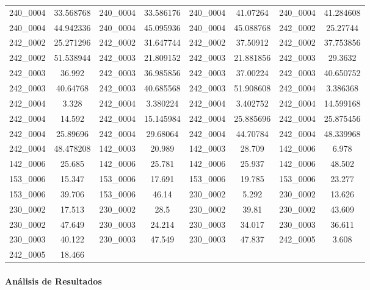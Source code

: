 \begin{table}[H]
\begin{tabular}{|c|c|c|c|c|c|c|c|}
        240\_0004 & 33.568768 & 240\_0004 & 33.586176 & 240\_0004 & 41.07264 & 240\_0004 & 41.284608 \\
        240\_0004 & 44.942336 & 240\_0004 & 45.095936 & 240\_0004 & 45.088768 & 242\_0002 & 25.27744 \\
        242\_0002 & 25.271296 & 242\_0002 & 31.647744 & 242\_0002 & 37.50912 & 242\_0002 & 37.753856 \\
        242\_0002 & 51.538944 & 242\_0003 & 21.809152 & 242\_0003 & 21.881856 & 242\_0003 & 29.3632 \\
        242\_0003 & 36.992 & 242\_0003 & 36.985856 & 242\_0003 & 37.00224 & 242\_0003 & 40.650752 \\
        242\_0003 & 40.64768 & 242\_0003 & 40.685568 & 242\_0003 & 51.908608 & 242\_0004 & 3.386368 \\
        242\_0004 & 3.328 & 242\_0004 & 3.380224 & 242\_0004 & 3.402752 & 242\_0004 & 14.599168 \\
        242\_0004 & 14.592 & 242\_0004 & 15.145984 & 242\_0004 & 25.885696 & 242\_0004 & 25.875456 \\
        242\_0004 & 25.89696 & 242\_0004 & 29.68064 & 242\_0004 & 44.70784 & 242\_0004 & 48.339968 \\
        242\_0004 & 48.478208 & 142\_0003 & 20.989 & 142\_0003 & 28.709 & 142\_0006 & 6.978 \\
        142\_0006 & 25.685 & 142\_0006 & 25.781 & 142\_0006 & 25.937 & 142\_0006 & 48.502 \\
        153\_0006 & 15.347 & 153\_0006 & 17.691 & 153\_0006 & 19.785 & 153\_0006 & 23.277 \\
        153\_0006 & 39.706 & 153\_0006 & 46.14 & 230\_0002 & 5.292 & 230\_0002 & 13.626 \\
        230\_0002 & 17.513 & 230\_0002 & 28.5 & 230\_0002 & 39.81 & 230\_0002 & 43.609 \\
        230\_0002 & 47.649 & 230\_0003 & 24.214 & 230\_0003 & 34.017 & 230\_0003 & 36.611 \\
        230\_0003 & 40.122 & 230\_0003 & 47.549 & 230\_0003 & 47.837 & 242\_0005 & 3.608 \\
        242\_0005 & 18.466 & & & & & & \\
        \hline
    \end{tabular}
\end{table}

\paragraph{Análisis de Resultados}

